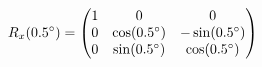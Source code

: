 \documentclass[preview]{standalone}
\begin{document}
\begin{align*}
\special{dvisvgm:raw <g id='unique000'>}R_x(0.5^\circ) = \begin{pmatrix} 1 & 0 & 0 \\ 0 & \cos(0.5^\circ) & -\sin(0.5^\circ) \\ 0 & \sin(0.5^\circ) & \cos(0.5^\circ) \end{pmatrix}\special{dvisvgm:raw </g>}
\end{align*}
\end{document}
